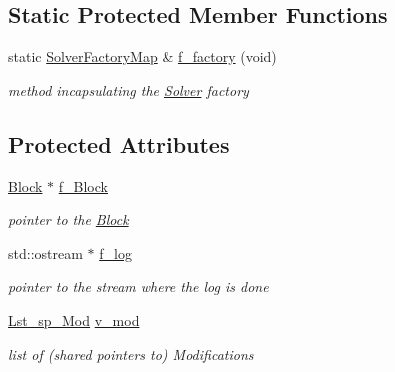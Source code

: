 \subsection*{Static Protected Member Functions}
\begin{DoxyCompactItemize}
\item 
static \mbox{\hyperlink{class_s_m_spp__di__unipi__it_1_1_solver_a648aad605b7d80ef4469835bb60fc6c4}{Solver\+Factory\+Map}} \& \mbox{\hyperlink{class_s_m_spp__di__unipi__it_1_1_solver_a118d563efb394530fe4b808bb3c1afbf}{f\+\_\+factory}} (void)
\begin{DoxyCompactList}\small\item\em method incapsulating the \mbox{\hyperlink{class_s_m_spp__di__unipi__it_1_1_solver}{Solver}} factory \end{DoxyCompactList}\end{DoxyCompactItemize}
\subsection*{Protected Attributes}
\begin{DoxyCompactItemize}
\item 
\mbox{\label{class_s_m_spp__di__unipi__it_1_1_solver_a372d458e214710b23cf375b9a6edc5fc}} 
\mbox{\hyperlink{class_s_m_spp__di__unipi__it_1_1_block}{Block}} $\ast$ \mbox{\hyperlink{class_s_m_spp__di__unipi__it_1_1_solver_a372d458e214710b23cf375b9a6edc5fc}{f\+\_\+\+Block}}
\begin{DoxyCompactList}\small\item\em pointer to the \mbox{\hyperlink{class_s_m_spp__di__unipi__it_1_1_block}{Block}} \end{DoxyCompactList}\item 
\mbox{\label{class_s_m_spp__di__unipi__it_1_1_solver_afe5f512d40cc0da4ccb4a10dcd505a0c}} 
std\+::ostream $\ast$ \mbox{\hyperlink{class_s_m_spp__di__unipi__it_1_1_solver_afe5f512d40cc0da4ccb4a10dcd505a0c}{f\+\_\+log}}
\begin{DoxyCompactList}\small\item\em pointer to the stream where the log is done \end{DoxyCompactList}\item 
\mbox{\label{class_s_m_spp__di__unipi__it_1_1_solver_a6a38515132fd5d2b8c3b905e2ed88f18}} 
\mbox{\hyperlink{group___modification___t_y_p_e_s_ga8a83b63d7963bc839660db495458f26d}{Lst\+\_\+sp\+\_\+\+Mod}} \mbox{\hyperlink{class_s_m_spp__di__unipi__it_1_1_solver_a6a38515132fd5d2b8c3b905e2ed88f18}{v\+\_\+mod}}
\begin{DoxyCompactList}\small\item\em list of (shared pointers to) Modifications \end{DoxyCompactList}\end{DoxyCompactItemize}
